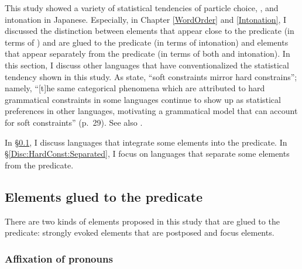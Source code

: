 This study showed a variety of statistical tendencies of particle choice, , and intonation in Japanese.
Especially, in Chapter \ref{WordOrder} and \ref{Intonation},
I discussed the distinction between
elements that appear close to the predicate (in terms of ) and are glued to the predicate (in terms of intonation) and
elements that appear separately from the predicate (in terms of both  and intonation).
In this section,
I discuss other languages that have conventionalized the statistical tendency shown in this study.
As  state,
``soft constraints mirror hard constrains'';
namely, ``[t]he same categorical phenomena which are attributed to hard grammatical constraints in some languages continue to show up as statistical preferences in other languages,
motivating a grammatical model that can account for soft constraints'' (p.~29).
See also \cite{givon79,bybeehopper01}.

In \S \ref{Disc:HardConst:Integrated},
I discuss languages that
integrate some elements into the predicate.
In \S \ref{Disc:HardConst:Separated},
I focus on languages that
separate some elements from the predicate.

\subsection{Elements glued to the predicate}\label{Disc:HardConst:Integrated}

There are two kinds of elements proposed in this study
that are glued to the predicate:
strongly evoked elements that are postposed and
focus elements.

\subsubsection{Affixation of pronouns}


